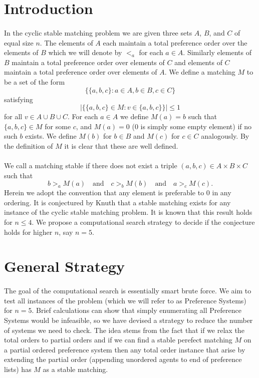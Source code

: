 \documentclass[letterpaper,12pt,oneside,onecolumn]{article}
\begin{document}
\section{Introduction}
\paragraph{}
In the cyclic stable matching problem we are given three sets $A$, $B$, and $C$ of equal size $n$. The elements of $A$ each maintain a total preference order over the elements of $B$ which we will denote by $<_a$ for each $a \in A$. Similarly elements of $B$ maintain a total preference order over elements of $C$ and elements of $C$ maintain a total preference order over elements of $A$. We define a matching $M$ to be a set of the form
$$\{ \{a,b,c\}: a \in A, b \in B, c\in C\}$$
satisfying 
$$|\{ \{a,b,c\} \in M : v \in \{a,b,c\}\}| \leq 1$$
for all $v \in A \cup B \cup C$. For each $a \in A$ we define $M(a) = b$ such that $\{a,b,c\} \in M$ for some $c$, and $M(a) = 0$ ($0$ is simply some empty element) if no such $b$ exists. We define $M(b)$ for $b \in B$ and $M(c)$ for $c \in C$ analogously. By the definition of $M$ it is clear that these are well defined.
\paragraph{}
We call a matching stable if there does not exist a triple $(a,b,c) \in A \times B \times C$ such that 
$$ b >_a M(a) \quad\text{and}\quad c >_b M(b) \quad\text{and}\quad a>_c M(c).$$
Herein we adopt the convention that any element is preferable to $0$ in any ordering. It is conjectured  by Knuth that a stable matching exists for any instance of the cyclic stable matching problem. It is known that this result holds for $n \leq 4$. We propose a computational search strategy to decide if the conjecture holds for higher $n$, say $n=5$.
\section{General Strategy}
\paragraph{}
The goal of the computational search is essentially smart brute force. We aim to test all instances of the problem (which we will refer to as Preference Systems) for $n=5$. Brief calculations can show that simply enumerating all Preference Systems would be infeasible, so we have devised a strategy to reduce the number of systems we need to check. The idea stems from the fact that if we relax the total orders to partial orders and if we can find a stable perefect matching $M$ on a partial ordered preference system then any total order instance that arise by extending the partial order (appending unordered agents to end of preference lists) has $M$ as a stable matching. 
\end{document}
